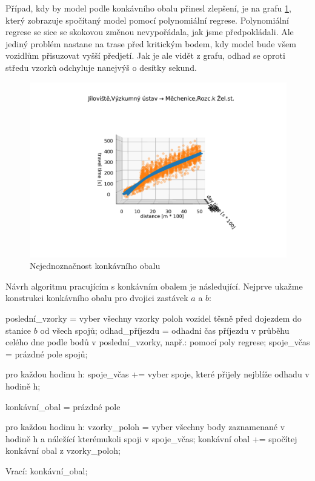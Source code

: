 \bigbreak


Případ, kdy by model podle konkávního obalu přinesl zlepšení, je na grafu \ref{fig:good_to_concave_hull}, který zobrazuje spočítaný model pomocí polynomiální regrese. Polynomiální regrese se sice se skokovou změnou nevypořádala, jak jsme předpokládali. Ale jediný problém nastane na trase před kritickým bodem, kdy model bude všem vozidlům přisuzovat vyšší předjetí. Jak je ale vidět z grafu, odhad se oproti středu vzorků odchyluje nanejvýš o desítky sekund.


\begin{figure}
\centering
  \includegraphics[width=1\linewidth]{../img/good_to_concave_hull}
  \caption{Nejednoznačnost konkávního obalu}
  \label{fig:good_to_concave_hull}
\end{figure}


\bigbreak


Návrh algoritmu pracujícím s konkávním obalem je následující. Nejprve ukažme konstrukci konkávního obalu pro dvojici zastávek $a$ a $b$:


\begin{code}[frame=none]
poslední_vzorky = vyber všechny vzorky poloh vozidel
  těsně před dojezdem do stanice $b$ od všech spojů;
odhad_příjezdu = odhadni čas příjezdu v průběhu celého
  dne podle bodů v poslední_vzorky, např.: pomocí poly regrese;
spoje_včas = prázdné pole spojů;


pro každou hodinu h:
  spoje_včas += vyber spoje, které přijely nejblíže
    odhadu v hodině h;


konkávní_obal = prázdné pole


pro každou hodinu h:
  vzorky_poloh = vyber všechny body zaznamenané
    v hodině h a náležící kterémukoli spoji v spoje_včas;
  konkávní obal += spočítej konkávní obal z vzorky_poloh;


Vrací: konkávní_obal;
\end{code}


